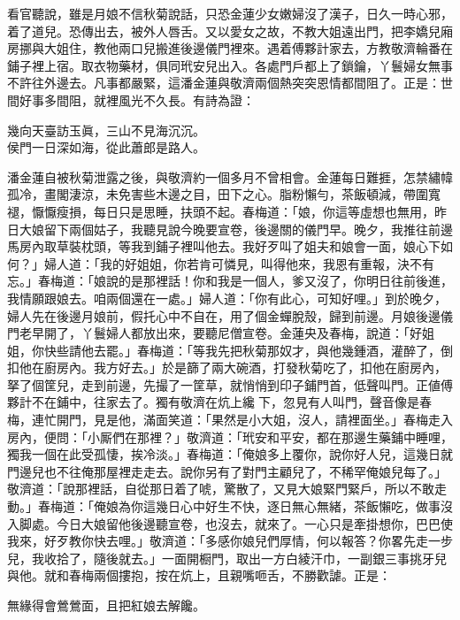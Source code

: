 看官聽說，雖是月娘不信秋菊說話，只恐金蓮少女嫩婦沒了漢子，日久一時心邪，着了道兒。恐傳出去，被外人唇舌。又以愛女之故，不教大姐遠出門，把李嬌兒廂房挪與大姐住，教他兩口兒搬進後邊儀門裡來。遇着傅夥計家去，方教敬濟輪番在鋪子裡上宿。取衣物藥材，俱同玳安兒出入。各處門戶都上了鎖鑰，丫鬟婦女無事不許往外邊去。凡事都嚴緊，這潘金蓮與敬濟兩個熱突突恩情都間阻了。正是：世間好事多間阻，就裡風光不久長。有詩為證：

\begin{myquote}
幾向天臺訪玉眞，三山不見海沉沉。\\侯門一日深如海，從此蕭郎是路人。
\end{myquote}

潘金蓮自被秋菊泄露之後，與敬濟約一個多月不曾相會。金蓮每日難捱，怎禁繡幃孤冷，畫閣淒涼，未免害些木邊之目，田下之心。脂粉懶勻，茶飯頓減，帶圍寬褪，懨懨瘦損，每日只是思睡，扶頭不起。春梅道：「娘，你這等虛想也無用，昨日大娘留下兩個姑子，我聽見說今晚要宣卷，後邊關的儀門早。晚夕，我推往前邊馬房內取草裝枕頭，等我到鋪子裡叫他去。我好歹叫了姐夫和娘會一面，娘心下如何？」婦人道：「我的好姐姐，你若肯可憐見，叫得他來，我恩有重報，決不有忘。」{}春梅道：「娘說的是那裡話！你和我是一個人，爹又沒了，你明日往前後進，我情願跟娘去。咱兩個還在一處。」婦人道：「你有此心，可知好哩。」到於晚夕，婦人先在後邊月娘前，假托心中不自在，用了個金蟬脫殼，歸到前邊。月娘後邊儀門老早開了，丫鬟婦人都放出來，要聽尼僧宣卷。金蓮央及春梅，說道：「好姐姐，你快些請他去罷。」春梅道：「等我先把秋菊那奴才，與他幾鍾酒，灌醉了，倒扣他在廚房內。我方好去。」於是篩了兩大碗酒，打發秋菊吃了，扣他在廚房內，拏了個筐兒，走到前邊，先撮了一筐草，就悄悄到印子鋪門首，低聲叫門。正値傅夥計不在鋪中，往家去了。獨有敬濟在炕上纔𢱉下，忽見有人叫門，聲音像是春梅，連忙開門，見是他，滿面笑道：「果然是小大姐，沒人，請裡面坐。」春梅走入房內，便問：「小厮們在那裡？」{}敬濟道：「玳安和平安，都在那邊生藥鋪中睡哩，獨我一個在此受孤悽，挨冷淡。」春梅道：「俺娘多上覆你，說你好人兒，這幾日就門邊兒也不往俺那屋裡走走去。說你另有了對門主顧兒了，不稀罕俺娘兒每了。」敬濟道：「說那裡話，自從那日着了唬，驚散了，又見大娘緊門緊戶，所以不敢走動。」春梅道：「俺娘為你這幾日心中好生不快，逐日無心無緒，茶飯懶吃，做事沒入脚處。今日大娘留他後邊聽宣卷，也沒去，就來了。一心只是牽掛想你，巴巴使我來，好歹教你快去哩。」敬濟道：「多感你娘兒們厚情，何以報答？你畧先走一步兒，我收拾了，隨後就去。」一面開橱門，取出一方白綾汗巾，一副銀三事挑牙兒與他。就和春梅兩個摟抱，按在炕上，且親嘴咂舌，不勝歡謔。正是：

\begin{myquote}
無緣得會鶯鶯面，且把紅娘去解饞。
\end{myquote}

